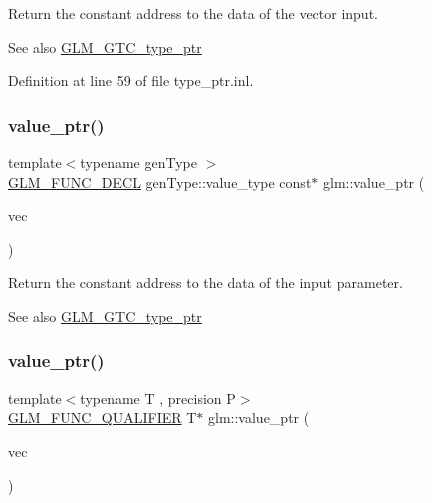 Return the constant address to the data of the vector input. \begin{DoxySeeAlso}{See also}
\mbox{\hyperlink{group__gtc__type__ptr}{G\+L\+M\+\_\+\+G\+T\+C\+\_\+type\+\_\+ptr}} 
\end{DoxySeeAlso}


Definition at line 59 of file type\+\_\+ptr.\+inl.

\mbox{\label{group__gtc__type__ptr_gaf019636bb8bd7c9efb7c7ce3bb23bcfc}} 
\subsubsection{\texorpdfstring{value\_ptr()}{value\_ptr()}\hspace{0.1cm}{\footnotesize\ttfamily [6/27]}}
{\footnotesize\ttfamily template$<$typename gen\+Type $>$ \\
\mbox{\hyperlink{setup_8hpp_ab2d052de21a70539923e9bcbf6e83a51}{G\+L\+M\+\_\+\+F\+U\+N\+C\+\_\+\+D\+E\+CL}} gen\+Type\+::value\+\_\+type const$\ast$ glm\+::value\+\_\+ptr (\begin{DoxyParamCaption}\item[{gen\+Type const \&}]{vec }\end{DoxyParamCaption})}

Return the constant address to the data of the input parameter. \begin{DoxySeeAlso}{See also}
\mbox{\hyperlink{group__gtc__type__ptr}{G\+L\+M\+\_\+\+G\+T\+C\+\_\+type\+\_\+ptr}} 
\end{DoxySeeAlso}
\mbox{\label{group__gtc__type__ptr_ga4c19763f3c5991b9dc88a3ffdd9ea6cd}} 
\subsubsection{\texorpdfstring{value\_ptr()}{value\_ptr()}\hspace{0.1cm}{\footnotesize\ttfamily [7/27]}}
{\footnotesize\ttfamily template$<$typename T , precision P$>$ \\
\mbox{\hyperlink{setup_8hpp_a33fdea6f91c5f834105f7415e2a64407}{G\+L\+M\+\_\+\+F\+U\+N\+C\+\_\+\+Q\+U\+A\+L\+I\+F\+I\+ER}} T$\ast$ glm\+::value\+\_\+ptr (\begin{DoxyParamCaption}\item[{\mbox{\hyperlink{structglm_1_1tvec4}{tvec4}}$<$ T, P $>$ \&}]{vec }\end{DoxyParamCaption})}

